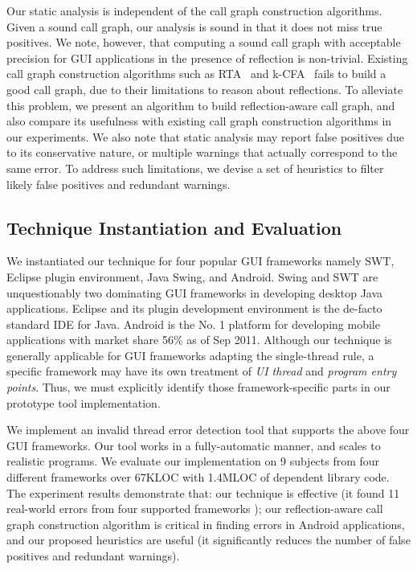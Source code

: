 Our static analysis is independent of the call graph construction algorithms.
Given a sound call graph, our analysis is sound in that it does
not miss true positives. We note, however, that computing a sound
call graph with acceptable precision for GUI applications in the presence of reflection
is non-trivial.
Existing call graph construction algorithms such as RTA~\cite{rta}
and k-CFA~\cite{kcfa}
fails to build a good call graph, due to their limitations
to reason about reflections.  To alleviate this problem,
we present an algorithm to build reflection-aware call graph, and
also compare its usefulness with existing call graph construction algorithms in
our experiments. We also note that static analysis may report false positives due to its
conservative nature, or multiple warnings that actually correspond
to the same error. To address such limitations, we devise a set
 of heuristics to filter likely false positives and redundant warnings.

\subsection{Technique Instantiation and Evaluation}


We instantiated our technique for four popular GUI frameworks namely SWT,
Eclipse plugin environment, Java Swing, and Android. 
Swing and SWT are unquestionably 
two dominating GUI frameworks in developing desktop Java applications.
Eclipse and its plugin development environment is the de-facto standard
IDE for Java. Android is the No. 1 platform for
developing mobile applications with market share 56\% as of Sep 2011.
Although our technique is generally applicable for GUI
frameworks adapting the single-thread rule, a specific framework
may have its own treatment of \textit{UI thread} and \textit{program 
entry points}. Thus, we must explicitly identify those framework-specific
parts in our prototype tool implementation.



We implement an invalid thread error detection tool that supports
the above four GUI frameworks. Our tool works in a fully-automatic
 manner, and scales to realistic programs.
We evaluate our implementation on 9 subjects from four different
frameworks over 67KLOC with 1.4MLOC of dependent library code.
The experiment results demonstrate
that: our technique is effective (it found 11 real-world errors
from four supported frameworks
);
our reflection-aware call graph construction algorithm is
critical in finding errors in Android applications,
and our proposed
heuristics are useful (it significantly reduces the number of
false positives and redundant warnings).




